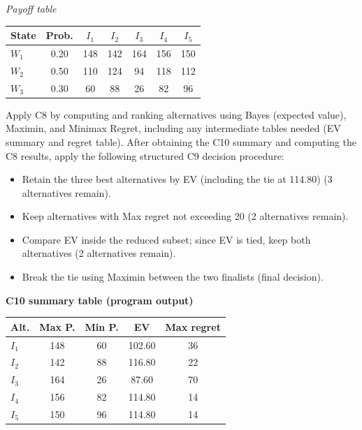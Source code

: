 \begin{ExamProblems}
		\begin{center}
			\textit{Payoff table} \\
			\begin{tabular}{l c c c c c c}
				\hline
				State& Prob. & $I_1$ & $I_2$ & $I_3$ & $I_4$ & $I_5$ \\
				\hline
				$W_1$ & 0.20 & 148 & 142 & 164 & 156 & 150 \\
				$W_2$ & 0.50 & 110 & 124 & 94 & 118 & 112 \\
				$W_3$ & 0.30 & 60 & 88 & 26 & 82 & 96 \\
				\hline
			\end{tabular}
		\end{center}
		
		Apply C8 by computing and ranking alternatives using Bayes (expected value), Maximin, and Minimax Regret, including any intermediate tables needed (EV summary and regret table).
		After obtaining the C10 summary and computing the C8 results, apply the following structured C9 decision procedure:
		\begin{itemize}
			\item Retain the three best alternatives by EV (including the tie at 114.80) (3 alternatives remain).
			\item Keep alternatives with Max regret not exceeding 20 (2 alternatives remain).
			\item Compare EV inside the reduced subset; since EV is tied, keep both alternatives (2 alternatives remain).
			\item Break the tie using Maximin between the two finalists (final decision).
		\end{itemize}
		
		\vspace{0.25cm}
		
		\textbf{C10 summary table (program output)}\par
		\begin{center}
			\begin{tabular}{l c c c c}
				\hline
				Alt. & Max P. & Min P. & EV & Max regret \\
				\hline
				$I_1$ & 148 & 60 & 102.60 & 36 \\
				$I_2$ & 142 & 88 & 116.80 & 22 \\
				$I_3$ & 164 & 26 & 87.60 & 70 \\
				$I_4$ & 156 & 82 & 114.80 & 14 \\
				$I_5$ & 150 & 96 & 114.80 & 14 \\
				\hline
			\end{tabular}
		\end{center}
		

\end{ExamProblems}
